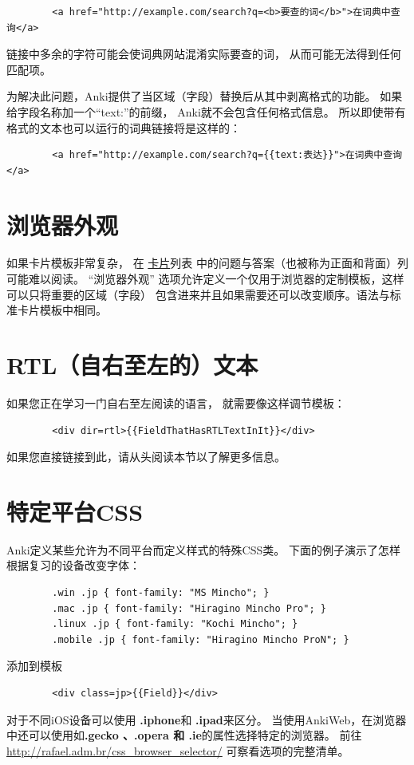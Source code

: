 \documentclass[a4paper]{book}
\begin{document}
	\begin{shaded}\begin{verbatim}
		<a href="http://example.com/search?q=<b>要查的词</b>">在词典中查询</a>
		\end{verbatim}\end{shaded}
	链接中多余的字符可能会使词典网站混淆实际要查的词， 从而可能无法得到任何匹配项。
	
	为解决此问题，Anki提供了当区域（字段）替换后从其中剥离格式的功能。 如果给字段名称加一个“text:”的前缀， Anki就不会包含任何格式信息。 所以即使带有格式的文本也可以运行的词典链接将是这样的：
	
	\begin{shaded}\begin{verbatim}
		<a href="http://example.com/search?q={{text:表达}}">在词典中查询</a>
		\end{verbatim}\end{shaded}
	\section{浏览器外观}\label{columntemplates}
	如果卡片模板非常复杂， 在 \hyperref[cardlist]{卡片}列表 中的问题与答案（也被称为正面和背面）列可能难以阅读。 “浏览器外观” 选项允许定义一个仅用于浏览器的定制模板，这样可以只将重要的区域（字段） 包含进来并且如果需要还可以改变顺序。语法与标准卡片模板中相同。
	
	\section{RTL（自右至左的）文本}
	如果您正在学习一门自右至左阅读的语言， 就需要像这样调节模板：
	
	\begin{shaded}\begin{verbatim}
		<div dir=rtl>{{FieldThatHasRTLTextInIt}}</div>
		\end{verbatim}\end{shaded}
	如果您直接链接到此，请从头阅读本节以了解更多信息。
	
	\section{特定平台CSS}
	Anki定义某些允许为不同平台而定义样式的特殊CSS类。 下面的例子演示了怎样根据复习的设备改变字体：
	
	\begin{shaded}\begin{verbatim}
		.win .jp { font-family: "MS Mincho"; }
		.mac .jp { font-family: "Hiragino Mincho Pro"; }
		.linux .jp { font-family: "Kochi Mincho"; }
		.mobile .jp { font-family: "Hiragino Mincho ProN"; }
		\end{verbatim}\end{shaded}
	添加到模板
	\begin{shaded}\begin{verbatim}
		<div class=jp>{{Field}}</div>
		\end{verbatim}\end{shaded}
	对于不同iOS设备可以使用 \textbf{.iphone}和 \textbf{.ipad}来区分。
	当使用AnkiWeb，在浏览器中还可以使用如\textbf{.gecko 、\textbf{.opera} 和 .ie}的属性选择特定的浏览器。 前往 \url{http://rafael.adm.br/css_browser_selector/} 可察看选项的完整清单。
	
\end{document}
